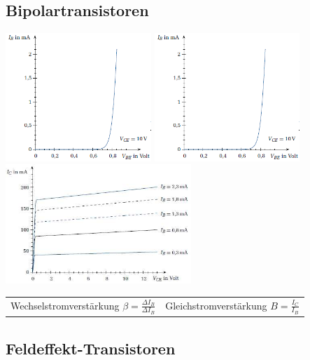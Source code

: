 \subsection{Bipolartransistoren}
\includegraphics[width=5.5cm]{bilder/bipolarEingangsKennlinie}
\includegraphics[width=5.5cm]{bilder/bipolarVerstaerkungsKennlinie}
\includegraphics[width=7cm]{bilder/bipolarAusgangsKennlinie}\\
\begin{tabular}{ll}
	Wechselstromverstärkung $\beta = \frac{\Delta I_B}{\Delta I_B} $&
	Gleichstromverstärkung $B = \frac{I_C}{I_B}$\\
\end{tabular}

\subsection{Feldeffekt-Transistoren}

